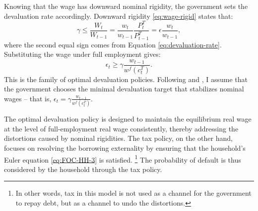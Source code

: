 Knowing that the wage has downward nominal rigidity, the government sets the devaluation rate accordingly. Downward rigidity \eqref{eq:wage-rigid} states that:
\begin{equation*}
    \gamma \le \frac{W_t}{W_{t-1}} = \frac{w_t}{w_{t-1}} \frac{P^T_t}{P^T_{t-1}} = \epsilon \frac{w_t}{w_{t-1}},
\end{equation*}
where the second equal sign comes from Equation \eqref{eq:devaluation-rate}. Substituting the wage under full employment gives:
\begin{equation}
    \epsilon_t \ge \gamma \frac{w_{t-1}}{w^f(c^T_t)}.
\end{equation}
This is the family of optimal devaluation policies. Following \citet{Na-18} and \citet*{Hinrichsen_2020-chapter4}, I assume that the government chooses the minimal devaluation target that stabilizes nominal wages -- that is, $
    \epsilon_t = \gamma \frac{w_{t-1}}{w^f(c^T_t)}.
$

The optimal devaluation policy is designed to maintain the equilibrium real wage at the level of full-employment real wage consistently, thereby addressing the distortions caused by nominal rigidities. The tax policy, on the other hand, focuses on resolving the borrowing externality by ensuring that the household's Euler equation \eqref{eq:FOC-HH-3} is satisfied.%
\footnote{
    In other words, tax in this model is not used as a channel for the government to repay debt, but as a channel to undo the distortions.
}
The probability of default is thus considered by the household through the tax policy.